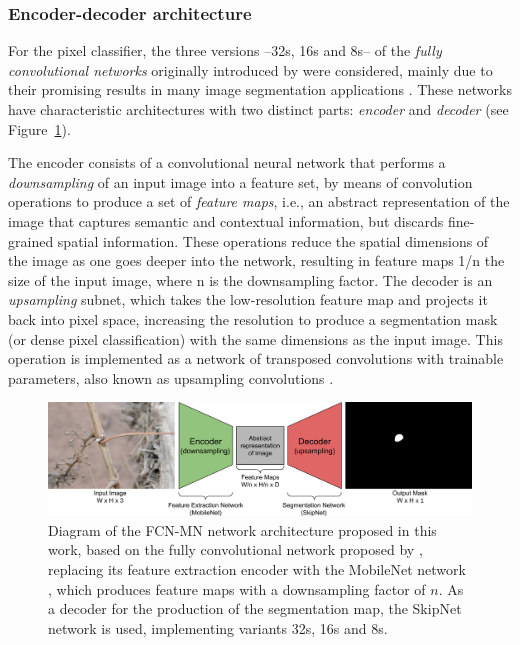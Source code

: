 \documentclass[a4paper,authoryear,review]{elsarticle}
\begin{document}
\subsubsection {Encoder-decoder architecture}
\label{sec:fcnmn}

For the pixel classifier, the three versions --32s, 16s and 8s-- of the \emph{fully convolutional networks} originally introduced by \citet{long2015fully} were considered, mainly due to their promising results in many image segmentation applications \citep{litjens2017survey, garcia2018survey, kaymak2019brief}. These networks have characteristic architectures with two distinct parts: \emph{encoder} and \emph{decoder} (see Figure~\ref{fig:Figure1}). 

The encoder consists of a convolutional neural network that performs a \emph{downsampling} of an input image into a feature set, by means of convolution operations to produce a set of \emph{feature maps}, i.e., an abstract representation of the image that captures semantic and contextual information, but discards fine-grained spatial information. These operations reduce the spatial dimensions of the image as one goes deeper into the network, resulting in feature maps 1/n the size of the input image, where n is the downsampling factor. The decoder is an \emph{upsampling} subnet, which takes the low-resolution feature map and projects it back into pixel space, increasing the resolution to produce a segmentation mask (or dense pixel classification) with the same dimensions as the input image. This operation is implemented as a network of transposed convolutions with trainable parameters, also known as upsampling convolutions \citep{shelhamer2017fully}. 


\begin{figure}
    \centering
    \includegraphics[width=12cm]{Figure1.png}
    \caption{
Diagram of the FCN-MN network architecture proposed in this work, based on the fully convolutional network proposed by \citet{shelhamer2017fully}, replacing its feature extraction encoder with the MobileNet network \citet{howard2017mobilenets}, which produces feature maps with a downsampling factor of $n$. As a decoder for the production of the segmentation map, the SkipNet network \citet{siam2018rtseg} is used, implementing variants 32s, 16s and 8s.
    }
    \label{fig:Figure1}
\end{figure}
\end{document}
